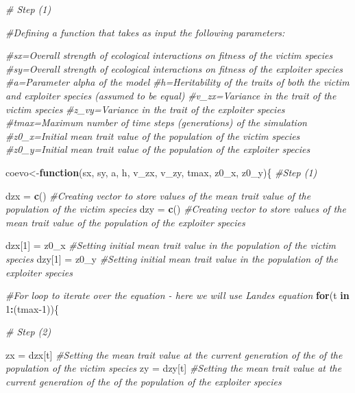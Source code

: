 \documentclass[
]{book}
\newenvironment{Shaded}{\begin{snugshade}}{\end{snugshade}}
\newcommand{\CommentTok}[1]{\textcolor[rgb]{0.56,0.35,0.01}{\textit{#1}}}
\newcommand{\ControlFlowTok}[1]{\textcolor[rgb]{0.13,0.29,0.53}{\textbf{#1}}}
\newcommand{\DecValTok}[1]{\textcolor[rgb]{0.00,0.00,0.81}{#1}}
\newcommand{\FunctionTok}[1]{\textcolor[rgb]{0.13,0.29,0.53}{\textbf{#1}}}
\newcommand{\NormalTok}[1]{#1}
\newcommand{\OtherTok}[1]{\textcolor[rgb]{0.56,0.35,0.01}{#1}}
\newcommand{\SpecialCharTok}[1]{\textcolor[rgb]{0.81,0.36,0.00}{\textbf{#1}}}
\begin{document}
\begin{Shaded}
\begin{Highlighting}[]
\CommentTok{\# Step (1)}

\CommentTok{\#Defining a function that takes as input the following parameters:}

\CommentTok{\#sx=Overall strength of ecological interactions on fitness of the victim species}
\CommentTok{\#sy=Overall strength of ecological interactions on fitness of the exploiter species}
\CommentTok{\#a=Parameter alpha of the model}
\CommentTok{\#h=Heritability of the traits of both the victim and exploiter species (assumed to be equal)}
\CommentTok{\#v\_zx=Variance in the trait of the victim species}
\CommentTok{\#z\_vy=Variance in the trait of the exploiter species}
\CommentTok{\#tmax=Maximum number of time steps (generations) of the simulation}
\CommentTok{\#z0\_x=Initial mean trait value of the population of the victim species}
\CommentTok{\#z0\_y=Initial mean trait value of the population of the exploiter species}

\NormalTok{coevo}\OtherTok{\textless{}{-}}\ControlFlowTok{function}\NormalTok{(sx, sy, a, h, v\_zx, v\_zy, tmax, z0\_x, z0\_y)\{ }\CommentTok{\#Step (1)}
  
\NormalTok{  dzx }\OtherTok{=} \FunctionTok{c}\NormalTok{() }\CommentTok{\#Creating vector to store values of the mean trait value of the population of the victim species }
\NormalTok{  dzy }\OtherTok{=} \FunctionTok{c}\NormalTok{() }\CommentTok{\#Creating vector to store values of the mean trait value of the population of the exploiter species}
  
\NormalTok{  dzx[}\DecValTok{1}\NormalTok{] }\OtherTok{=}\NormalTok{ z0\_x }\CommentTok{\#Setting initial mean trait value in the population of the victim species}
\NormalTok{  dzy[}\DecValTok{1}\NormalTok{] }\OtherTok{=}\NormalTok{ z0\_y }\CommentTok{\#Setting initial mean trait value in the population of the exploiter species}
  
  \CommentTok{\#For loop to iterate over the equation {-} here we will use Lande\textquotesingle{}s equation}
  \ControlFlowTok{for}\NormalTok{(t }\ControlFlowTok{in} \DecValTok{1}\SpecialCharTok{:}\NormalTok{(tmax}\DecValTok{{-}1}\NormalTok{))\{}
    
    \CommentTok{\# Step (2)}
    
\NormalTok{    zx }\OtherTok{=}\NormalTok{ dzx[t] }\CommentTok{\#Setting the mean trait value at the current generation of the of the population of the victim species}
\NormalTok{    zy }\OtherTok{=}\NormalTok{ dzy[t] }\CommentTok{\#Setting the mean trait value at the current generation of the of the population of the exploiter species}
    

\end{Highlighting}
\end{Shaded}
\end{document}
